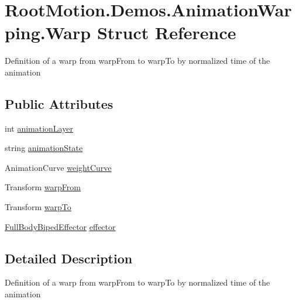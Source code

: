 \hypertarget{struct_root_motion_1_1_demos_1_1_animation_warping_1_1_warp}{}\section{Root\+Motion.\+Demos.\+Animation\+Warping.\+Warp Struct Reference}
\label{struct_root_motion_1_1_demos_1_1_animation_warping_1_1_warp}


Definition of a warp from \textquotesingle{}warp\+From\textquotesingle{} to \textquotesingle{}warp\+To\textquotesingle{} by normalized time of the animation  


\subsection*{Public Attributes}
\begin{DoxyCompactItemize}
\item 
int \mbox{\hyperlink{struct_root_motion_1_1_demos_1_1_animation_warping_1_1_warp_ae00fd96def970e932559586e33513a2b}{animation\+Layer}}
\item 
string \mbox{\hyperlink{struct_root_motion_1_1_demos_1_1_animation_warping_1_1_warp_a26217b95edeb391734ab86e5adefb95d}{animation\+State}}
\item 
Animation\+Curve \mbox{\hyperlink{struct_root_motion_1_1_demos_1_1_animation_warping_1_1_warp_a28f88e940d36c2c8de9aee5881cef977}{weight\+Curve}}
\item 
Transform \mbox{\hyperlink{struct_root_motion_1_1_demos_1_1_animation_warping_1_1_warp_af0d486d5c0b8eafc41ddf3aac1d53400}{warp\+From}}
\item 
Transform \mbox{\hyperlink{struct_root_motion_1_1_demos_1_1_animation_warping_1_1_warp_aaa8eaf81a17ae104cf5a56df32788dd0}{warp\+To}}
\item 
\mbox{\hyperlink{namespace_root_motion_1_1_final_i_k_ae0dd2058c7667b6f132c11a6b860c14a}{Full\+Body\+Biped\+Effector}} \mbox{\hyperlink{struct_root_motion_1_1_demos_1_1_animation_warping_1_1_warp_a2cec6fdfcd56c2493dbab05e0449be78}{effector}}
\end{DoxyCompactItemize}


\subsection{Detailed Description}
Definition of a warp from \textquotesingle{}warp\+From\textquotesingle{} to \textquotesingle{}warp\+To\textquotesingle{} by normalized time of the animation 



